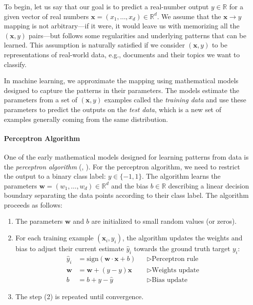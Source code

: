 To begin, let us say that our goal is to predict a real-number output $y \in \mathbb{R}$ for a given vector of real numbers $\mathbf{x} = (x_1, \ldots, x_d) \in \mathbb{R}^d$.
We assume that the $\mathbf{x} \rightarrow y$ mapping is not arbitrary---if it were, it would leave us with memorizing all the $(\mathbf{x},y)$ pairs---but follows some regularities and underlying patterns that can be learned. This assumption is naturally satisfied if we consider $(\mathbf{x},y)$ to be representations of real-world data, e.g., documents and their topics we want to classify.

In machine learning, we approximate the mapping using mathematical models designed to capture the patterns in their parameters. The models estimate the parameters from a set of $(\mathbf{x},y)$ examples called the \textit{training data} and use these parameters to predict the outputs on the \textit{test data}, which is a new set of examples generally coming from the same distribution.

\paragraph{Perceptron Algorithm} One of the early mathematical models designed for learning patterns from data is the \emph{perceptron algorithm} (\citealp{rosenblatt1958perceptron}, \citealp[p.~192]{bishop2006pattern}). For the perceptron algorithm, we need to restrict the output to a binary class label: $y \in \{-1, 1\}$. The algorithm learns the parameters $\textbf{w} = (w_1, \ldots, w_d) \in \mathbb{R}^d$ and the bias $b \in \mathbb{R}$ describing a linear decision boundary separating the data points according to their class label. The algorithm proceeds as follows:


\begin{enumerate}
    \item The parameters $\textbf{w}$ and $b$ are initialized to small random values (or zeros).
    \item For each training example $(\mathbf{x}_i, y_i)$, the algorithm updates the weights and bias to adjust their current estimate $\hat{y}_i$ towards the ground truth target $y_i$:
          \begin{align} \label{eq:perceptron1}
              \hat{y}_i  & = \text{sign}(\textbf{w} \cdot \mathbf{x} + b) &  & \triangleright\text{Perceptron rule} \\
              \textbf{w} & = \textbf{w} + (y - \hat{y}) \textbf{x}        &  & \triangleright\text{Weights update}  \\
              b          & = b + y - \hat{y}                              &  & \triangleright\text{Bias update}
          \end{align}
    \item The step (2) is repeated until convergence.
\end{enumerate}

